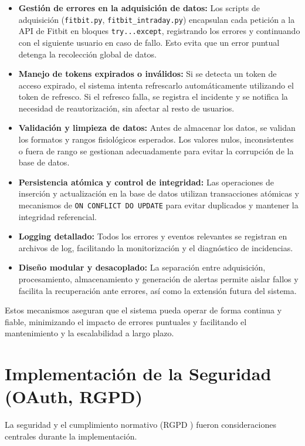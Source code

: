 \begin{itemize}
    \item \textbf{Gestión de errores en la adquisición de datos:} Los scripts de adquisición (\texttt{fitbit.py}, \texttt{fitbit\_intraday.py}) encapsulan cada petición a la API de Fitbit en bloques \texttt{try...except}, registrando los errores y continuando con el siguiente usuario en caso de fallo. Esto evita que un error puntual detenga la recolección global de datos.
    \item \textbf{Manejo de tokens expirados o inválidos:} Si se detecta un token de acceso expirado, el sistema intenta refrescarlo automáticamente utilizando el token de refresco. Si el refresco falla, se registra el incidente y se notifica la necesidad de reautorización, sin afectar al resto de usuarios.
    \item \textbf{Validación y limpieza de datos:} Antes de almacenar los datos, se validan los formatos y rangos fisiológicos esperados. Los valores nulos, inconsistentes o fuera de rango se gestionan adecuadamente para evitar la corrupción de la base de datos.
    \item \textbf{Persistencia atómica y control de integridad:} Las operaciones de inserción y actualización en la base de datos utilizan transacciones atómicas y mecanismos de \texttt{ON CONFLICT DO UPDATE} para evitar duplicados y mantener la integridad referencial.
    \item \textbf{Logging detallado:} Todos los errores y eventos relevantes se registran en archivos de log, facilitando la monitorización y el diagnóstico de incidencias.
    \item \textbf{Diseño modular y desacoplado:} La separación entre adquisición, procesamiento, almacenamiento y generación de alertas permite aislar fallos y facilita la recuperación ante errores, así como la extensión futura del sistema.
\end{itemize}

Estos mecanismos aseguran que el sistema pueda operar de forma continua y fiable, minimizando el impacto de errores puntuales y facilitando el mantenimiento y la escalabilidad a largo plazo.

\section{Implementación de la Seguridad (OAuth, RGPD)}
\label{sec:impl_seguridad}

La seguridad y el cumplimiento normativo (RGPD \citep{rgpd_texto_oficial}) fueron consideraciones centrales durante la implementación.

